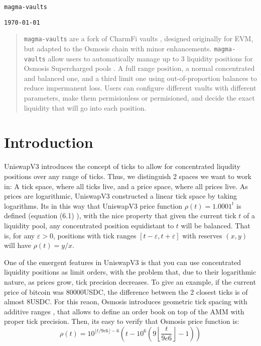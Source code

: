 \documentclass[11pt]{article}
\begin{document}
\begin{center}
\texttt{\Large magma-vaults}

\vspace{0.5em} %
\texttt{\large \today}
\end{center}

\begin{abstract}
    \texttt{magma-vaults} are a fork of CharmFi vaults \cite{charmfi-doc},
    designed originally for EVM, but adapted to the Osmosis chain with minor
    enhancements. \texttt{magma-vaults} allow users to automatically manage up to 3
    liquidity positions for Osmosis Supercharged pools
    \cite{osmosis-supercharged-doc}. A full range position, a normal
    concentrated and balanced one, and a third limit one using out-of-proportion
    balances to reduce impermanent loss. Users can configure different vaults
    with different parameters, make them permisionless or permisioned, and
    decide the exact liquidity that will go into each position.
\end{abstract}

\section{Introduction}
UniswapV3 introduces the concept of ticks to allow for concentrated liqudity
positions over any range of ticks. Thus, we distinguish 2 spaces we want to work in:
A tick space, where all ticks live, and a price space, where all prices live. As
prices are logarithmic, UniswapV3 constructed a linear tick space by taking logarithms.
Its in this way that UniswapV3 price function $\rho(t) = 1.0001^t$ is defined 
(equation (6.1) \citep{uniswapv3}), with the nice property that given the current
tick $t$ of a liquidity pool, any concentrated position equidistant to $t$ will
be balanced. That is, for any $\varepsilon > 0$, positions with tick ranges
$[t-\varepsilon, t + \varepsilon]$ with reserves $(x, y)$ will have $\rho(t) =
y/x$.

One of the emergent features in UniswapV3 is that you can use concentrated
liquidity positions as limit orders, with the problem that, due to their
logarithmic nature, as prices grow, tick precision decreases. To give
an example, if the current price of bitcoin was 80000USDC, the difference
between the 2 closest ticks is of almost 8USDC. For this reaon, Osmosis introduces
geometric tick spacing with additive ranges \cite{osmosis-price-function}, that
allows to define an order book on top of the AMM with proper tick precision.
Then, its easy to verify that Osmosis price function is:
\[
\rho(t) = 10^{\lfloor t/9e6\rfloor - 6} \left(
    t - 10^6\left(9\left\lfloor\frac{t}{9e6}\right\rfloor - 1\right)
\right)
\]
\end{document}
